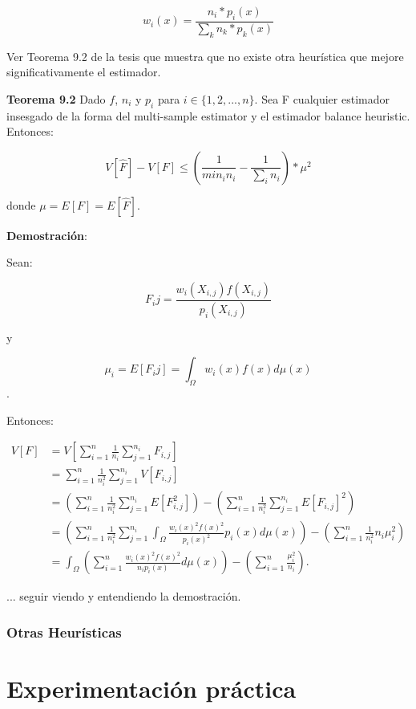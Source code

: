 \documentclass{article}
\begin{document}
$$ w_{i}(x) = \frac{n_{i} * p_{i}(x)}{\sum_{k} n_{k} * p_{k}(x)}$$

Ver Teorema 9.2 de la tesis que muestra que no existe otra heurística que mejore significativamente el estimador.

\textbf{Teorema 9.2} Dado $f$, $n_{i}$ y $p_{i}$ para $i \in \{1, 2, ..., n\}$. Sea F cualquier estimador insesgado de la forma del multi-sample estimator y  el estimador balance heuristic. Entonces:

$$V[\hat{F}] - V[F] \leq ( \frac{1}{min_{i} n_{i}} - \frac{1}{\sum_{i} n_{i}} ) * \mu^{2}$$

donde $\mu = E[F] = E[\hat{F}]$.

\textbf{Demostración}:

Sean:

$$ F_{i}{j} = \frac{w_{i}(X_{i,j}) f(X_{i,j})}{p_{i}(X_{i,j})}$$

y

$$ \mu_{i} = E[F_{i}{j}] =  \int_{\Omega} w_{i}(x) f(x) d\mu(x)$$.

Entonces:

\begin{align*}
  V[F] &= V\left[\sum_{i=1}^n \frac{1}{n_i} \sum_{j=1}^{n_i} F_{i,j}\right] \\
  &= \sum_{i=1}^n \frac{1}{n_i^2} \sum_{j=1}^{n_i} V[F_{i,j}] \\
  &= \left(\sum_{i=1}^n \frac{1}{n_i^2} \sum_{j=1}^{n_i} E[F_{i,j}^2]\right) - \left(\sum_{i=1}^n \frac{1}{n_i^2} \sum_{j=1}^{n_i} E[F_{i,j}]^2\right) \\
  &= \left(\sum_{i=1}^n \frac{1}{n_i^2} \sum_{j=1}^{n_i} \int_{\Omega} \frac{w_i(x)^2 f(x)^2}{p_i(x)^2} p_{i}(x) d\mu(x)\right) - \left(\sum_{i=1}^n \frac{1}{n_i^2} n_i  \mu_i^2\right) \\
  &= \int_{\Omega} \left(\sum_{i=1}^n \frac{w_i(x)^2 f(x)^2}{n_i p_i(x)} d\mu(x)\right) - \left(\sum_{i=1}^n \frac{\mu_i^2}{n_i}\right).
\end{align*}

... seguir viendo y entendiendo la demostración.

\subsubsection{Otras Heurísticas}

\section{Experimentación práctica}
\end{document}
